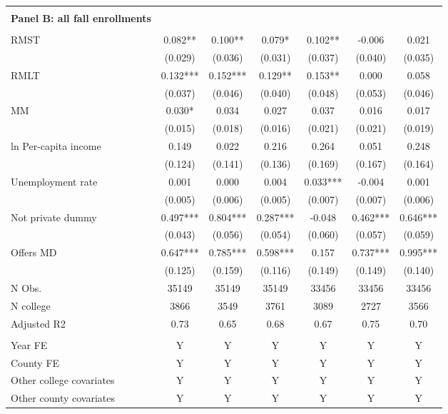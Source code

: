 \documentclass[12pt]{article}%
\begin{document}
\begin{table}[!htbp]
\begin{threeparttable}
\begin{tabular}{@{\extracolsep{-6pt}}lcccccc}
\hline  \\[-1.8ex] 
\textbf{Panel B: all fall enrollments}\\  \\[-1.8ex] 
RMST & 0.082** & 0.100** & 0.079* & 0.102** & -0.006 & 0.021 \\
& (0.029) & (0.036) & (0.031) & (0.037) & (0.040) & (0.035) \\
RMLT & 0.132*** & 0.152*** & 0.129** & 0.153** & 0.000 & 0.058 \\
& (0.037) & (0.046) & (0.040) & (0.048) & (0.053) & (0.046) \\
MM & 0.030* & 0.034 & 0.027 & 0.037 & 0.016 & 0.017 \\
& (0.015) & (0.018) & (0.016) & (0.021) & (0.021) & (0.019) \\
ln Per-capita income & 0.149 & 0.022 & 0.216 & 0.264 & 0.051 & 0.248 \\
& (0.124) & (0.141) & (0.136) & (0.169) & (0.167) & (0.164) \\
Unemployment rate & 0.001 & 0.000 & 0.004 & 0.033*** & -0.004 & 0.001 \\
& (0.005) & (0.006) & (0.005) & (0.007) & (0.007) & (0.006) \\
Not private dummy & 0.497*** & 0.804*** & 0.287*** & -0.048 & 0.462*** &
0.646*** \\
& (0.043) & (0.056) & (0.054) & (0.060) & (0.057) & (0.059) \\
Offers MD & 0.647*** & 0.785*** & 0.598*** & 0.157 & 0.737*** &
0.995*** \\
& (0.125) & (0.159) & (0.116) & (0.149) & (0.149) & (0.140) \\
\hline
N Obs. & 35149 & 35149 & 35149 & 33456 & 33456 & 33456 \\
N college & 3866 & 3549 & 3761 & 3089 & 2727 & 3566 \\
Adjusted R2 & 0.73 & 0.65 & 0.68 & 0.67 & 0.75 & 0.70 \\
\midrule  \\[-1.8ex]   
Year FE & Y & Y & Y & Y & Y & Y \\
County FE & Y & Y & Y & Y & Y & Y \\
Other college covariates & Y & Y & Y & Y & Y & Y \\
Other county covariates & Y & Y & Y & Y & Y & Y \\
\bottomrule
\end{tabular}

  \end{threeparttable}
\end{table}
\FloatBarrier
\end{document}
